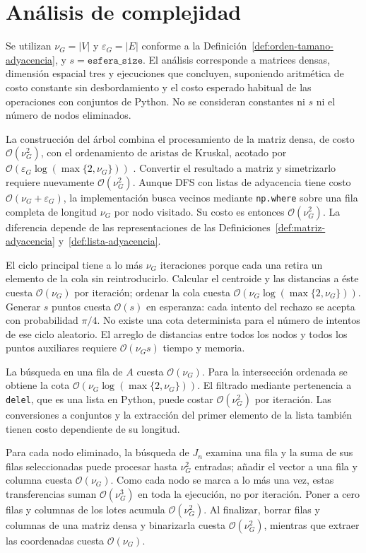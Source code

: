 \section{Análisis de complejidad}

Se utilizan $\nu_G=|V|$ y $\varepsilon_G=|E|$ conforme a la Definición~\ref{def:orden-tamano-adyacencia}, y $s=\texttt{esfera\_size}$. El análisis corresponde a matrices densas, dimensión espacial tres y ejecuciones que concluyen, suponiendo aritmética de costo constante sin desbordamiento y el costo esperado habitual de las operaciones con conjuntos de Python. No se consideran constantes ni $s$ ni el número de nodos eliminados.

La construcción del árbol combina el procesamiento de la matriz densa, de costo $\mathcal O(\nu_G^2)$, con el ordenamiento de aristas de Kruskal, acotado por $\mathcal O(\varepsilon_G\log(\max\{2,\nu_G\}))$ \cite{Introduction-toalgorithm}. Convertir el resultado a matriz y simetrizarlo requiere nuevamente $\mathcal O(\nu_G^2)$. Aunque DFS con listas de adyacencia tiene costo $\mathcal O(\nu_G+\varepsilon_G)$, la implementación busca vecinos mediante \texttt{np.where} sobre una fila completa de longitud $\nu_G$ por nodo visitado. Su costo es entonces $\mathcal O(\nu_G^2)$. La diferencia depende de las representaciones de las Definiciones~\ref{def:matriz-adyacencia} y~\ref{def:lista-adyacencia}.

El ciclo principal tiene a lo más $\nu_G$ iteraciones porque cada una retira un elemento de la cola sin reintroducirlo. Calcular el centroide y las distancias a éste cuesta $\mathcal O(\nu_G)$ por iteración; ordenar la cola cuesta $\mathcal O(\nu_G\log(\max\{2,\nu_G\}))$. Generar $s$ puntos cuesta $\mathcal O(s)$ en esperanza: cada intento del rechazo se acepta con probabilidad $\pi/4$. No existe una cota determinista para el número de intentos de ese ciclo aleatorio. El arreglo de distancias entre todos los nodos y todos los puntos auxiliares requiere $\mathcal O(\nu_G s)$ tiempo y memoria.

La búsqueda en una fila de $A$ cuesta $\mathcal O(\nu_G)$. Para la intersección ordenada se obtiene la cota $\mathcal O(\nu_G\log(\max\{2,\nu_G\}))$. El filtrado mediante pertenencia a \texttt{delel}, que es una lista en Python, puede costar $\mathcal O(\nu_G^2)$ por iteración. Las conversiones a conjuntos y la extracción del primer elemento de la lista también tienen costo dependiente de su longitud.

Para cada nodo eliminado, la búsqueda de $J_n$ examina una fila y la suma de sus filas seleccionadas puede procesar hasta $\nu_G^2$ entradas; añadir el vector a una fila y columna cuesta $\mathcal O(\nu_G)$. Como cada nodo se marca a lo más una vez, estas transferencias suman $\mathcal O(\nu_G^3)$ en toda la ejecución, no por iteración. Poner a cero filas y columnas de los lotes acumula $\mathcal O(\nu_G^2)$. Al finalizar, borrar filas y columnas de una matriz densa y binarizarla cuesta $\mathcal O(\nu_G^2)$, mientras que extraer las coordenadas cuesta $\mathcal O(\nu_G)$.


